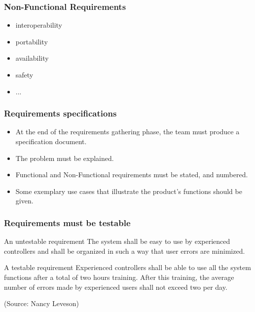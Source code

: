\documentclass[10pt, handout]{beamer}
\begin{document}
\begin{frame}[fragile]
  \frametitle{Non-Functional Requirements}
  \begin{itemize}
  \item interoperability
  \item portability
  \item availability
  \item safety
  \item ...
  \end{itemize}
\end{frame}

\begin{frame}[fragile]
\frametitle{Requirements specifications}
\begin{itemize}
\item At the end of the requirements gathering phase, the team must produce a
  specification document.
\item The problem must be explained.
\item Functional and Non-Functional requirements must be stated, and numbered.
\item Some exemplary use cases that illustrate the product's functions should be
  given.
\end{itemize}
\end{frame}

\begin{frame}[fragile]
  \frametitle{Requirements must be testable}
  \begin{alertblock}{An untestable requirement}
    The system shall be easy to use by experienced
    controllers and shall be organized in such a way
    that user errors are minimized.
  \end{alertblock}
  \begin{exampleblock}{A testable requirement}
    Experienced controllers shall be able to use all
    the system functions after a total of two hours
    training. After this training, the average number
    of errors made by experienced users shall not
    exceed two per day.
  \end{exampleblock}
  \tiny (Source: Nancy Leveson)
\end{frame}
\end{document}
